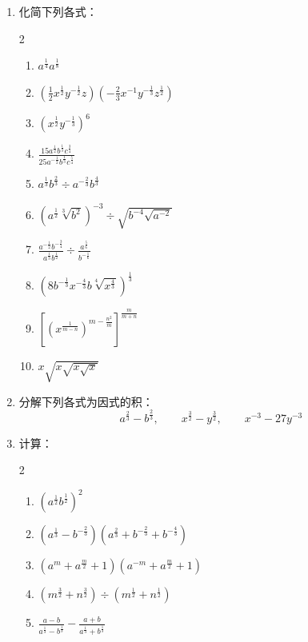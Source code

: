 \begin{enumerate}
\item 化简下列各式：
\begin{multicols}{2}
    \begin{enumerate}
\item $a^{\tfrac{1}{4}}a^{\tfrac{1}{8}}$
\item $\left(\frac{1}{2}x^{\tfrac{1}{2}}y^{-\tfrac{1}{2}}z\right)\left(-\frac{2}{3}x^{-1}y^{-\tfrac{1}{3}}z^{\tfrac{1}{2}}\right)$
\item $\left(x^{\tfrac{1}{2}}y^{-\tfrac{1}{3}}\right)^6$
\item $\frac{15a^{\tfrac{1}{2}}b^{\tfrac{1}{3}}c^{\tfrac{3}{4}}}{25a^{-\tfrac{1}{2}}b^{\tfrac{1}{3}}c^{\tfrac{5}{4}}}$
\item $a^{\tfrac{1}{3}}b^{\tfrac{2}{3}}\div a^{-\tfrac{2}{3}}b^{\tfrac{4}{3}}$
\item $\left(a^{\tfrac{1}{2}}\sqrt[3]{b^2}\right)^{-3}\div \sqrt{b^{-4}\sqrt{a^{-2}}}$
\item $\frac{a^{-\tfrac{1}{2}}b^{-\tfrac{3}{4}}}{a^{\tfrac{1}{3}}b^{\tfrac{1}{2}}}\div \frac{a^{\tfrac{5}{6}}}{b^{-\tfrac{1}{6}}}$
\item $\left(8b^{-\tfrac{1}{3}}x^{-\tfrac{4}{3}}b\sqrt[4]{x^{\tfrac{4}{3}}}\right)^{\tfrac{1}{3}}$
\item $\left[\left(x^{\tfrac{1}{m-n}}\right)^{m-\tfrac{n^2}{m}}\right]^{\tfrac{m}{m+n}}$
\item $x\sqrt{x\sqrt{x\sqrt{x}}}$
    \end{enumerate}
\end{multicols}

\item 分解下列各式为因式的积：
\[a^{\tfrac{2}{3}}-b^{\tfrac{2}{3}},\qquad x^{\tfrac{3}{2}}-y^{\tfrac{3}{2}},\qquad x^{-3}-27y^{-3} \]

\item 计算：
\begin{multicols}{2}
    \begin{enumerate}
\item $\left(a^{\tfrac{1}{2}}b^{\tfrac{1}{2}}\right)^2$
\item $\left(a^{\tfrac{1}{3}}-b^{-\tfrac{2}{3}}\right)\left(a^{\tfrac{2}{3}}+b^{-\tfrac{2}{3}}+b^{-\tfrac{4}{3}}\right)$
\item $\left(a^{m}+a^{\tfrac{m}{2}}+1\right)\left(a^{-m}+a^{\tfrac{m}{2}}+1\right)$
\item $\left(m^{\tfrac{3}{2}}+n^{\tfrac{3}{2}}\right)\div \left(m^{\tfrac{1}{2}}+n^{\tfrac{1}{2}}\right)$
\item $\frac{a-b}{a^{\tfrac{1}{3}}-b^{\tfrac{1}{3}}}-\frac{a+b}{a^{\tfrac{1}{3}}+b^{\tfrac{1}{3}}}$
    \end{enumerate}
\end{multicols}
\end{enumerate}

